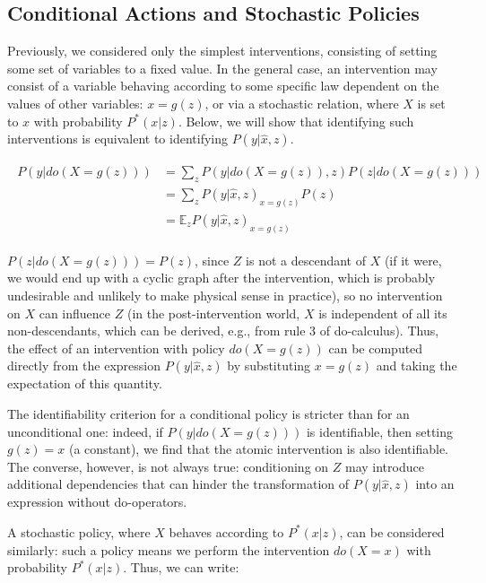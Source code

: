 \documentclass[fleqn]{article}
\numberwithin{equation}{section}
\numberwithin{theorem}{section}
\numberwithin{figure}{section}
\numberwithin{lemma}{section}
\numberwithin{corollary}{section}
\begin{document}
\subsection*{Conditional Actions and Stochastic Policies}

Previously, we considered only the simplest interventions, consisting of setting some set of variables to a fixed value. In the general case, an intervention may consist of a variable behaving according to some specific law dependent on the values of other variables: $x = g(z)$, or via a stochastic relation, where $X$ is set to $x$ with probability $P^*(x|z)$. Below, we will show that identifying such interventions is equivalent to identifying $P(y|\hat x, z)$.

\begin{align}
	\begin{split}
		P(y|do(X=g(z))) &= \sum\limits_{z}P(y|do(X=g(z)),z)P(z|do(X=g(z)))\\
		& = \sum\limits_{z}P(y|\hat x,z)_{x=g(z)}P(z) \\
		&= \mathbb{E}_zP(y|\hat x, z)_{x=g(z)}
	\end{split}
\end{align}

$P(z|do(X=g(z))) = P(z)$, since $Z$ is not a descendant of $X$ (if it were, we would end up with a cyclic graph after the intervention, which is probably undesirable and unlikely to make physical sense in practice), so no intervention on $X$ can influence $Z$ (in the post-intervention world, $X$ is independent of all its non-descendants, which can be derived, e.g., from rule 3 of do-calculus). Thus, the effect of an intervention with policy $do(X=g(z))$ can be computed directly from the expression $P(y|\hat x,z)$ by substituting $x=g(z)$ and taking the expectation of this quantity.

The identifiability criterion for a conditional policy is stricter than for an unconditional one: indeed, if $P(y|do(X=g(z)))$ is identifiable, then setting $g(z) = x$ (a constant), we find that the atomic intervention is also identifiable. The converse, however, is not always true: conditioning on $Z$ may introduce additional dependencies that can hinder the transformation of $P(y|\hat x, z)$ into an expression without do-operators.

A stochastic policy, where $X$ behaves according to $P^*(x|z)$, can be considered similarly: such a policy means we perform the intervention $do(X=x)$ with probability $P^*(x|z)$. Thus, we can write:
\end{document}
